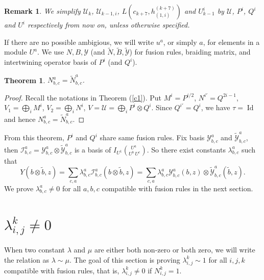 \documentclass{article}
\newtheorem{theorem}[lemma]{Theorem}
\newtheorem{remark}[lemma]{Remark}
\newcommand{\ito}[3]{\left(^{\ \ {#3}}_{{#1}\ {#2}}\right)}
\begin{document}
\begin{remark}\label{rmk}
We simplify $\mathcal{U}_k$, $\mathcal{U}_{k-1,i}$, $L\left(c_{k+7},h_{(1,i)}^{(k+7)}\right)$ and $U_{k-1}^i$ 
by $\mathcal{U}$, $P^i$, $Q^i$ and $U^i$ respectively from now on,
unless otherwise specified.
\end{remark}

If there are no possible ambigious,
we will write $u^a$, or simply $a$, for elements in a module $U^a$.
We use $N,B,\mathcal{Y}$ (and $\tilde{N},\tilde{B},\tilde{\mathcal{Y}}$)
for fusion rules, braiding matrix, and intertwining operator basis
of $P^i$ (and $Q^i$).

\begin{theorem}\label{same fusion rule}
$N_{b,c}^a=\tilde{N}_{b,c}^a$.
\end{theorem}
\begin{proof}
Recall the notations in Theorem (\ref{c1}). Put $M^i=P^{i/2}$, $N^{i'}=Q^{2i-1}$, 
$V_1=\bigoplus_i M^i$, $V_2=\bigoplus_i N^i$,
$V=\mathcal{U}=\bigoplus_i P^i\otimes Q^i$.
Since $Q^{i'}=Q^i$,
we have $\tau=\operatorname{Id}$ and hence $N_{b,c}^a=\tilde{N}_{b,c}^a$.
\end{proof}

From this theorem, $P^i$ and $Q^i$ share same fusion rules.
Fix basis $\mathcal{Y}_{b,c}^a$ and $\tilde{\mathcal{Y}}_{b,c}^a$, 
then $\mathcal{I}_{b,c}^a=\mathcal{Y}_{b,c}^a\otimes \tilde{\mathcal{Y}}_{b,c}^a$ is a basis of
$I_{U^1}\ito{U^b}{U^c}{U^a}$.
So there exist constants $\lambda_{b,c}^a$ such that
$$Y(b\otimes\tilde{b},z)=\sum_{c,a}\lambda_{b,c}^a\mathcal{I}_{b,c}^a(b\otimes\tilde{b},z)=\sum_{c,a}\lambda_{b,c}^a\mathcal{Y}_{b,c}^a(b,z)\otimes\tilde{\mathcal{Y}}_{b,c}^a(\tilde{b},z).$$
We prove $\lambda_{b,c}^a\neq 0$ for all $a,b,c$ compatible with fusion rules in the next section.

\section{$\lambda_{i,j}^k\neq 0$}
When two constant $\lambda$ and $\mu$ are either both non-zero or both zero, 
we will write the relation as $\lambda\sim \mu$.
The goal of this section is proving $\lambda_{i,j}^k\sim 1$ for all $i,j,k$ compatible with fusion rules, that is, $\lambda_{i,j}^k\neq 0$ if $N_{i,j}^k=1$.
\end{document}
